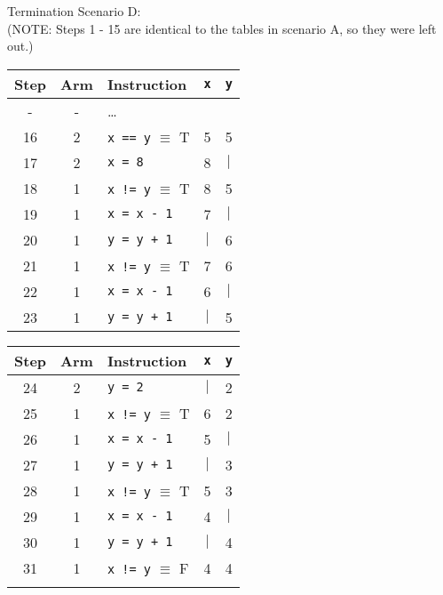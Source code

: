 \documentclass[11pt]{article}
\newcommand{\code}[1]{\texttt{#1}}
\begin{document}
\begin{enumerate}
\begin{enumerate}
	Termination Scenario D: \\
	(NOTE: Steps 1 - 15 are identical to the tables in scenario A, so they were left out.)\\
	
	\begin{tabular}{c |c | l | c | c }
		Step & Arm & Instruction	&	\code{x}	&  \code{y}	\\
		\hline
		- 	& - & \ldots & & \\
		16 	& 2 & \code{x == y} $\equiv$ T	&	5	&	5\\
		17 	& 2 & \code{x = 8}				&	8	&	$|$\\
		18 	& 1 & \code{x != y} $\equiv$ T	&	8	&	5\\
		19 	& 1 & \code{x = x - 1}			&	7	&	$|$\\
		20 	& 1 & \code{y = y + 1}			&	$|$	&	6\\
		21 	& 1 & \code{x != y} $\equiv$ T	&	7	&	6\\
		22 	& 1 & \code{x = x - 1}			&	6	&	$|$\\
		23 	& 1 & \code{y = y + 1}			&	$|$	&	5\\
		\end{tabular}\hspace{0.8cm}
	\begin{tabular}{c |c | l | c | c }
		Step & Arm & Instruction	&	\code{x}	&  \code{y}	\\
		\hline
		24 	& 2 & \code{y = 2}				&	$|$	&	2\\
		25 	& 1 & \code{x != y} $\equiv$ T	&	6	&	2\\
		26 	& 1 & \code{x = x - 1}			&	5	&	$|$\\
		27 	& 1 & \code{y = y + 1}			&	$|$	&	3\\
		28 	& 1 & \code{x != y} $\equiv$ T	&	5	&	3\\
		29 	& 1 & \code{x = x - 1}			&	4	&	$|$\\
		30 	& 1 & \code{y = y + 1}			&	$|$	&	4\\
		31 	& 1 & \code{x != y} $\equiv$ F	&	4	&	4\\
		&&&&\\
		
	\end{tabular}\\
	

\end{enumerate}
\end{enumerate}
\end{document}
